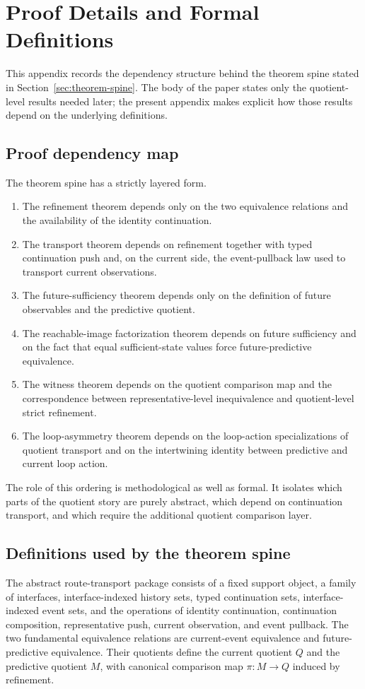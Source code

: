 \documentclass[11pt]{article}
\newcommand{\CurrentQ}{Q}
\newcommand{\PredictiveQ}{M}
\theoremstyle{definition}
\begin{document}
\section{Proof Details and Formal Definitions}\label{app:proof-details}
This appendix records the dependency structure behind the theorem spine stated in Section~\ref{sec:theorem-spine}. The body of the paper states only the quotient-level results needed later; the present appendix makes explicit how those results depend on the underlying definitions.

\subsection{Proof dependency map}\label{appsubsec:proof-dependency-map}
The theorem spine has a strictly layered form.
\begin{enumerate}
\item The refinement theorem depends only on the two equivalence relations and the availability of the identity continuation.
\item The transport theorem depends on refinement together with typed continuation push and, on the current side, the event-pullback law used to transport current observations.
\item The future-sufficiency theorem depends only on the definition of future observables and the predictive quotient.
\item The reachable-image factorization theorem depends on future sufficiency and on the fact that equal sufficient-state values force future-predictive equivalence.
\item The witness theorem depends on the quotient comparison map and the correspondence between representative-level inequivalence and quotient-level strict refinement.
\item The loop-asymmetry theorem depends on the loop-action specializations of quotient transport and on the intertwining identity between predictive and current loop action.
\end{enumerate}

The role of this ordering is methodological as well as formal. It isolates which parts of the quotient story are purely abstract, which depend on continuation transport, and which require the additional quotient comparison layer.

\subsection{Definitions used by the theorem spine}\label{appsubsec:proof-definitions}
The abstract route-transport package consists of a fixed support object, a family of interfaces, interface-indexed history sets, typed continuation sets, interface-indexed event sets, and the operations of identity continuation, continuation composition, representative push, current observation, and event pullback. The two fundamental equivalence relations are current-event equivalence and future-predictive equivalence. Their quotients define the current quotient $\CurrentQ$ and the predictive quotient $\PredictiveQ$, with canonical comparison map $\pi : \PredictiveQ \to \CurrentQ$ induced by refinement.
\end{document}
